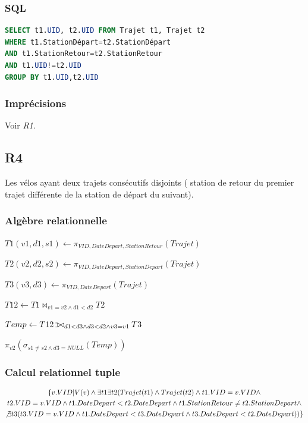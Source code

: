 \documentclass[a4paper, 12pt]{report}
\def\ojoin{\setbox0=\hbox{$\bowtie$}%
  \rule[-.02ex]{.25em}{.4pt}\llap{\rule[\ht0]{.25em}{.4pt}}}
\def\leftouterjoin{\mathbin{\ojoin\mkern-5.8mu\bowtie}}
\begin{document}
\subsubsection*{SQL}
\begin{lstlisting}[language=sql]
SELECT t1.UID, t2.UID FROM Trajet t1, Trajet t2
WHERE t1.StationDépart=t2.StationDépart
AND t1.StationRetour=t2.StationRetour
AND t1.UID!=t2.UID
GROUP BY t1.UID,t2.UID
\end{lstlisting}

\subsubsection*{Imprécisions}

Voir \textit{R1}.

\subsection*{R4}

Les vélos ayant deux trajets consécutifs disjoints ( station de retour du premier trajet différente de la station de départ du suivant).
\subsubsection*{Algèbre relationnelle}

$T1(v1,d1,s1)\leftarrow\pi_{VID,DateDepart,StationRetour}(Trajet)$

$T2(v2,d2,s2)\leftarrow\pi_{VID,DateDepart,StationDepart}(Trajet)$

$T3(v3,d3)\leftarrow\pi_{VID,DateDepart}(Trajet)$

$T12\leftarrow T1\bowtie_{v1=v2\wedge d1<d2}T2$

$Temp\leftarrow T12\leftouterjoin_{d1<d3\wedge d3<d2\wedge v3=v1}T3$

$\pi_{v2}(\sigma_{s1\neq s2\wedge d3=NULL} (Temp) )$

\subsubsection*{Calcul relationnel tuple}

\begin{multline*}
\{ v.VID |V(v)\wedge\exists t1\exists t2 ( Trajet(t1)\wedge Trajet(t2)\wedge t1.VID=v.VID\wedge \\
 t2.VID=v.VID\wedge t1.DateDepart<t2.DateDepart\wedge t1.StationRetour\neq t2.StationDepart\wedge \\
 \not\exists t3 ( t3.VID=v.VID\wedge t1.DateDepart<t3.DateDepart\wedge t3.DateDepart<t2.DateDepart ) )  \}
\end{multline*}
\end{document}
